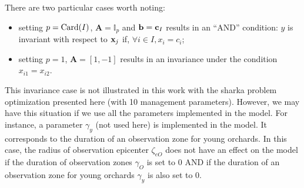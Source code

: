There are two particular cases worth noting:
\begin{itemize}
 \item setting $p=\operatorname{Card}(I)$, $\mathbf{A} = \mathbb{I}_p$ and $\mathbf{b}=\mathbf{c}_I$ results in an ``AND'' condition: $y$ is invariant with respect to $\mathbf{x}_j$ if, $\forall i \in I, x_i=c_i$;
 \item setting $p=1$, $\mathbf{A}=\left[1, -1 \right]$ results in an invariance under the condition $x_{i1} = x_{i2}$.
\end{itemize}

This invariance case is not illustrated in this work with the sharka problem optimization presented here (with 10 management parameters). However, we may have this situation if we use all the parameters implemented in the model. For instance, a parameter $\gamma_{y}$ (not used here) is implemented in the model. It corresponds to the duration of an observation zone for young orchards. In this case, the radius of observation epicenter $\zeta_{eO}$ does not have an effect on the model if the duration of observation zones $\gamma_{O}$ is set to 0 AND if the duration of an observation zone for young orchards $\gamma_{y}$ is also set to 0.

